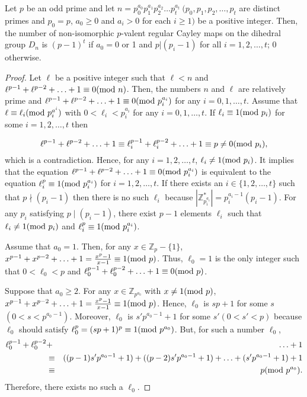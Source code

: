 \documentclass[12pt]{amsart}
\begin{document}
\begin{theorem} \label{main3}
Let $p$ be an odd prime and let  $n =
p_0^{a_0}p_{1}^{a_{1}}p_{2}^{a_{2}}\ldots p_{t}^{a_{t}}~( p_0,
p_{1}, p_{2}, \ldots, p_{t}$ are distinct primes and $p_0 = p$,
$a_0 \geq 0$ and $a_{i}
> 0$ for each $i \geq 1)$ be a positive integer. Then,
the number of non-isomorphic $p$-valent regular Cayley  maps on
the dihedral group $D_n$ is $(p-1)^{t}$ if $a_0=0$ or 1 and $p |
(p_i -1)$ for all $i =1,2, \ldots, t$; $0$ otherwise.
\end{theorem}
\begin{proof}
Let $\ell$ be a positive integer such that $\ell < n$ and
$\ell^{p-1} + \ell^{p-2} + \ldots + 1 \equiv 0 ({\hbox{\rm mod }} n)$. Then,
the numbers $n$ and $\ell$ are relatively prime and  $\ell^{p-1} +
\ell^{p-2} + \ldots + 1 \equiv 0 ({\hbox{\rm mod }} p_i^{a_i})$ for any $i=0,
1, \ldots, t$. Assume that  $\ell \equiv \ell_i ({\hbox{\rm mod }} p_i^{a^i})$
with $0 < \ell_i < p_i^{a_i}$ for any $i=0, 1, \ldots, t$. If
$\ell_i \equiv 1 ({\hbox{\rm mod }} p_i)$ for some $i=1, 2, \ldots, t$ then

$$\ell^{p-1} +
\ell^{p-2} + \ldots + 1 \equiv \ell_i^{p-1} + \ell_i^{p-2} +
\ldots + 1 \equiv p \neq 0 ({\hbox{\rm mod }} p_i), $$ which is a contradiction. Hence,
for any $i=1, 2, \ldots, t$, $\ell_i \neq 1 ({\hbox{\rm mod }} p_i)$. It
implies that the equation $\ell^{p-1} + \ell^{p-2} + \ldots + 1
\equiv 0 ({\hbox{\rm mod }} p_i^{a_i})$ is equivalent to the equation
$\ell_i^{p} \equiv 1 ({\hbox{\rm mod }} p_i^{a_i})$ for $i=1, 2, \ldots, t$. If
there exists an $i \in \{ 1,2, \ldots, t\}$ such that $p \nmid
(p_i -1)$ then there is no such $\ell_i$ because
$|\mathbb{Z}_{p_i^{a_i}}^{*}| = p_i^{a_i-1}(p_i-1)$. For any $p_i$
satisfying $p \mid (p_i -1)$, there exist $p-1$ elements $\ell_i$
such that $\ell_i \neq 1 ({\hbox{\rm mod }} p_i)$ and $\ell_i^{p} \equiv 1
({\hbox{\rm mod }} p_i^{a_i})$.

Assume that  $a_0=1$. Then, for any $x \in \mathbb{Z}_p - \{1\}$,
$x^{p-1}+x^{p-2}+\ldots+ 1 = \frac{x^p-1}{x-1} \equiv 1 ({\hbox{\rm mod }} p)$.
Thus,  $\ell_0 = 1$ is the only integer such that $0 < \ell_0 < p$
and $\ell_0^{p-1} + \ell_0^{p-2} + \ldots + 1 \equiv  0 ({\hbox{\rm mod }} p)$.

Suppose that  $a_0 \geq 2$. For any  $x \in \mathbb{Z}_{p^{a_0}}$
with $x \neq 1 ({\hbox{\rm mod }} p)$, $x^{p-1}+x^{p-2}+\ldots+ 1 =
\frac{x^p-1}{x-1} \equiv 1 ({\hbox{\rm mod }} p)$. Hence, $\ell_0$ is $sp + 1$
for some $s$$(0 < s < p^{a_0-1})$. Moreover, $\ell_0$ is
$s'p^{a_0-1} + 1$ for some $s'$$(0 < s' < p)$ because $\ell_0$
should satisfy $\ell_0^{p} = (sp + 1)^p \equiv 1 ({\hbox{\rm mod }} p^{a_0})$.
But, for such a number $\ell_0$,
 \begin{eqnarray*} \ell_0^{p-1} + \ell_0^{p-2} & + &
\ldots + 1 \\ &\equiv& ((p-1)s'p^{a_0-1} + 1) + ((p-2)s'p^{a_0-1}
+
1) + \ldots + (s'p^{a_0-1} + 1) +1  \\
& \equiv & p ({\hbox{\rm mod }} p^{a_0}).    \end{eqnarray*}
Therefore, there exists no such a $\ell_0$.


\end{proof}
\end{document}

